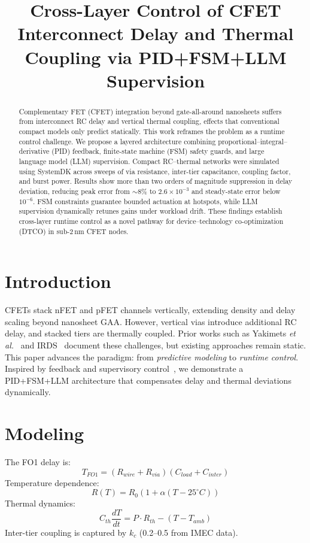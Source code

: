 \documentclass[conference]{IEEEtran}
\title{Cross-Layer Control of CFET Interconnect Delay and Thermal Coupling via PID+FSM+LLM Supervision}
\author{
  \IEEEauthorblockN{Shinichi Samizo}
  \IEEEauthorblockA{Independent Semiconductor Researcher\\
  Email: \href{mailto:shin3t72@gmail.com}{shin3t72@gmail.com}}
}
\begin{document}
\maketitle

\begin{abstract}
Complementary FET (CFET) integration beyond gate-all-around nanosheets suffers from interconnect RC delay and vertical thermal coupling, effects that conventional compact models only predict statically. This work reframes the problem as a runtime control challenge. We propose a layered architecture combining proportional--integral--derivative (PID) feedback, finite-state machine (FSM) safety guards, and large language model (LLM) supervision. Compact RC--thermal networks were simulated using SystemDK across sweeps of via resistance, inter-tier capacitance, coupling factor, and burst power. Results show more than two orders of magnitude suppression in delay deviation, reducing peak error from $\sim$8\% to $2.6\times 10^{-3}$ and steady-state error below $10^{-6}$. FSM constraints guarantee bounded actuation at hotspots, while LLM supervision dynamically retunes gains under workload drift. These findings establish cross-layer runtime control as a novel pathway for device--technology co-optimization (DTCO) in sub-2\,nm CFET nodes.
\end{abstract}

\section{Introduction}
CFETs stack nFET and pFET channels vertically, extending density and delay scaling beyond nanosheet GAA. However, vertical vias introduce additional RC delay, and stacked tiers are thermally coupled. Prior works such as Yakimets \textit{et al.}~\cite{yakimets2020cfet} and IRDS~\cite{irds2023} document these challenges, but existing approaches remain static. This paper advances the paradigm: from \emph{predictive modeling} to \emph{runtime control}. Inspired by feedback and supervisory control~\cite{franklin2015feedback,khalil2002nonlinear,anderson2007optimal}, we demonstrate a PID+FSM+LLM architecture that compensates delay and thermal deviations dynamically.

\section{Modeling}
The FO1 delay is:
\begin{equation}
T_{FO1} = (R_{wire}+R_{via})(C_{load}+C_{inter})
\end{equation}
Temperature dependence:
\begin{equation}
R(T) = R_0 \left(1 + \alpha (T-25^\circ C)\right)
\end{equation}
Thermal dynamics:
\begin{equation}
C_{th}\frac{dT}{dt} = P\cdot R_{th} - (T - T_{amb})
\end{equation}
Inter-tier coupling is captured by $k_c$ (0.2--0.5 from IMEC data).
\end{document}
